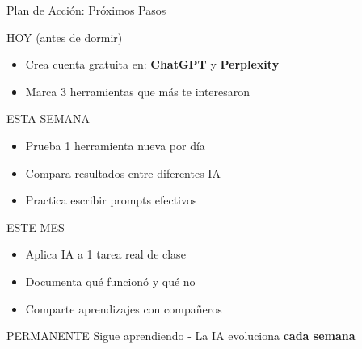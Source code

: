 \documentclass[aspectratio=169,xcolor={dvipsnames}]{beamer}
\begin{document}
	\begin{frame}{Plan de Acción: Próximos Pasos}
		
		\begin{block}{HOY (antes de dormir)}
			\begin{itemize}
				\item Crea cuenta gratuita en: \textbf{ChatGPT} y \textbf{Perplexity}
				\item Marca 3 herramientas que más te interesaron
			\end{itemize}
		\end{block}
		
		\begin{block}{ESTA SEMANA}
			\begin{itemize}
				\item Prueba 1 herramienta nueva por día
				\item Compara resultados entre diferentes IA
				\item Practica escribir prompts efectivos
			\end{itemize}
		\end{block}
		
		\begin{block}{ESTE MES}
			\begin{itemize}
				\item Aplica IA a 1 tarea real de clase
				\item Documenta qué funcionó y qué no
				\item Comparte aprendizajes con compañeros
			\end{itemize}
		\end{block}
		
		\begin{alertblock}{PERMANENTE}
			Sigue aprendiendo - La IA evoluciona \textbf{cada semana}
		\end{alertblock}
		
	\end{frame}
	
\end{document}
